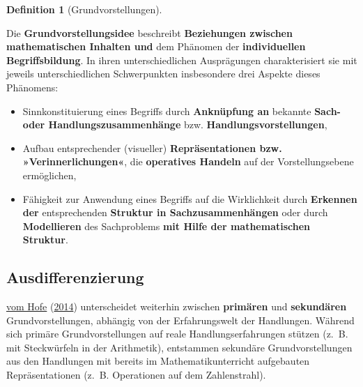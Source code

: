 \documentclass[
  ngerman,
]{scrbook}
\providecommand{\tightlist}{%
  \setlength{\itemsep}{0pt}\setlength{\parskip}{0pt}}
\theoremstyle{definition}
\newtheorem{definition}{Definition}[chapter]
\theoremstyle{definition}
\theoremstyle{definition}
\theoremstyle{definition}
\theoremstyle{remark}
\begin{document}
\begin{definition}[Grundvorstellungen]
\protect\hypertarget{def:Grundvorstellungen}{}\label{def:Grundvorstellungen}

Die \textbf{Grundvorstellungsidee} beschreibt \textbf{Beziehungen zwischen mathematischen Inhalten und} dem Phänomen der \textbf{individuellen Begriffsbildung}. In ihren unterschiedlichen Ausprägungen charakterisiert sie mit jeweils unterschiedlichen Schwerpunkten insbesondere drei Aspekte dieses Phänomens:

\begin{itemize}
\tightlist
\item
  Sinnkonstituierung eines Begriffs durch \textbf{Anknüpfung an} bekannte \textbf{Sach- oder Handlungszusammenhänge} bzw. \textbf{Handlungsvorstellungen},\\
\item
  Aufbau entsprechender (visueller) \textbf{Repräsentationen bzw. »Verinnerlichungen«}, die \textbf{operatives Handeln} auf der Vorstellungsebene ermöglichen,\\
\item
  Fähigkeit zur Anwendung eines Begriffs auf die Wirklichkeit durch \textbf{Erkennen der} entsprechenden \textbf{Struktur in Sachzusammenhängen} oder durch \textbf{Modellieren} des Sachproblems \textbf{mit Hilfe der mathematischen Struktur}.
\end{itemize}

\end{definition}

\hypertarget{ausdifferenzierung}{%
\subsection{Ausdifferenzierung}\label{ausdifferenzierung}}

\protect\hyperlink{ref-vomHofe2014}{vom Hofe} (\protect\hyperlink{ref-vomHofe2014}{2014}) unterscheidet weiterhin zwischen \textbf{primären} und \textbf{sekundären} Grundvorstellungen, abhängig von der Erfahrungswelt der Handlungen. Während sich primäre Grundvorstellungen auf reale Handlungserfahrungen stützen (z.~B. mit Steckwürfeln in der Arithmetik), entstammen sekundäre Grundvorstellungen aus den Handlungen mit bereits im Mathematikunterricht aufgebauten Repräsentationen (z.~B. Operationen auf dem Zahlenstrahl).
\end{document}
